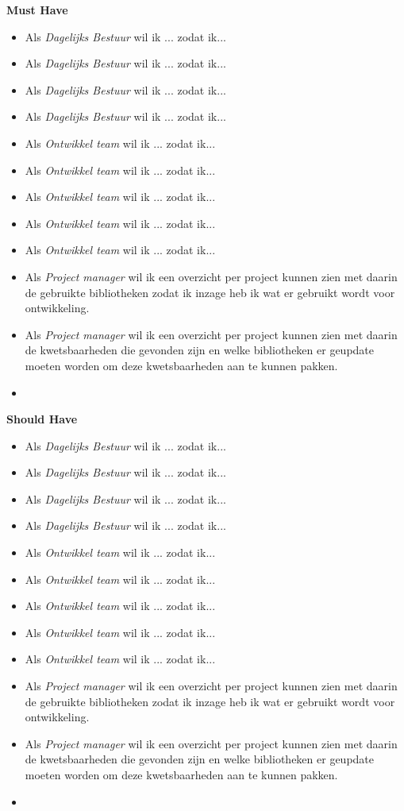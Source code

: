 \textbf{Must Have}
\begin{itemize}
  \item Als \textit{Dagelijks Bestuur} wil ik  ... zodat ik...
  \item Als \textit{Dagelijks Bestuur} wil ik  ... zodat ik...
  \item Als \textit{Dagelijks Bestuur} wil ik  ... zodat ik...
  \item Als \textit{Dagelijks Bestuur} wil ik  ... zodat ik...
  \item Als \textit{Ontwikkel team } wil ik  ... zodat ik...
  \item Als \textit{Ontwikkel team } wil ik  ... zodat ik...
  \item Als \textit{Ontwikkel team } wil ik  ... zodat ik...
  \item Als \textit{Ontwikkel team } wil ik  ... zodat ik...
  \item Als \textit{Ontwikkel team } wil ik  ... zodat ik...
  \item Als \textit{Project manager} wil ik een overzicht per project kunnen zien met daarin de gebruikte bibliotheken zodat ik inzage heb ik wat er gebruikt wordt voor ontwikkeling.
  \item Als \textit{Project manager} wil ik een overzicht per project kunnen zien met daarin de kwetsbaarheden die gevonden zijn en welke bibliotheken er geupdate moeten worden om deze kwetsbaarheden aan te kunnen pakken.\item
\end{itemize}

\textbf{Should Have}
\begin{itemize}
  \item Als \textit{Dagelijks Bestuur} wil ik  ... zodat ik...
  \item Als \textit{Dagelijks Bestuur} wil ik  ... zodat ik...
  \item Als \textit{Dagelijks Bestuur} wil ik  ... zodat ik...
  \item Als \textit{Dagelijks Bestuur} wil ik  ... zodat ik...
  \item Als \textit{Ontwikkel team } wil ik  ... zodat ik...
  \item Als \textit{Ontwikkel team } wil ik  ... zodat ik...
  \item Als \textit{Ontwikkel team } wil ik  ... zodat ik...
  \item Als \textit{Ontwikkel team } wil ik  ... zodat ik...
  \item Als \textit{Ontwikkel team } wil ik  ... zodat ik...
  \item Als \textit{Project manager} wil ik een overzicht per project kunnen zien met daarin de gebruikte bibliotheken zodat ik inzage heb ik wat er gebruikt wordt voor ontwikkeling.
  \item Als \textit{Project manager} wil ik een overzicht per project kunnen zien met daarin de kwetsbaarheden die gevonden zijn en welke bibliotheken er geupdate moeten worden om deze kwetsbaarheden aan te kunnen pakken.\item
\end{itemize}

